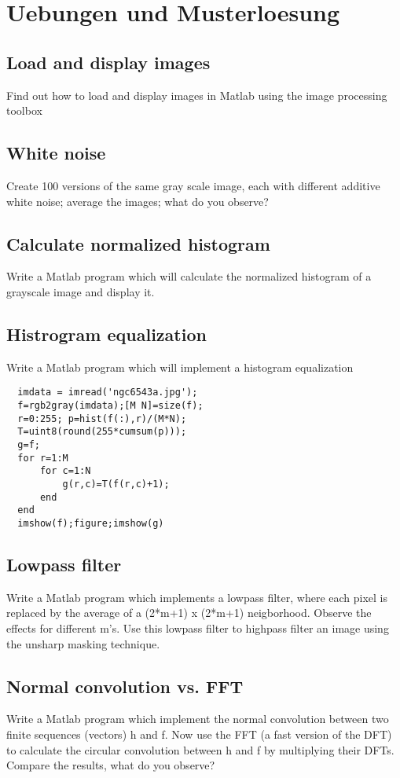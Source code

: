 \section{Uebungen und Musterloesung}
\lstset{language=Matlab}
\subsection{Load and display images}
Find out how to load and display images in Matlab using the image processing
toolbox
\subsection{White noise}
Create 100 versions of the same gray scale image, each with different additive
white noise; average the images; what do you observe?
\subsection{Calculate normalized histogram}
Write a Matlab program which will calculate the normalized histogram of a
grayscale image and display it. 
\subsection{Histrogram equalization}
Write a Matlab program which will implement a histogram equalization
\begin{lstlisting}
  imdata = imread('ngc6543a.jpg');
  f=rgb2gray(imdata);[M N]=size(f);
  r=0:255; p=hist(f(:),r)/(M*N);
  T=uint8(round(255*cumsum(p)));
  g=f;
  for r=1:M
      for c=1:N
          g(r,c)=T(f(r,c)+1);
      end
  end
  imshow(f);figure;imshow(g)
\end{lstlisting}
\subsection{Lowpass filter}
Write a Matlab program which implements a lowpass filter, where each pixel is
replaced by the average of a (2*m+1) x (2*m+1) neigborhood. Observe the effects for different m's. Use this lowpass filter to highpass filter an image using the unsharp masking technique. 
\subsection{Normal convolution vs. FFT}
Write a Matlab program which implement the normal convolution between two finite
sequences (vectors) h and f. Now use the FFT (a fast version of the DFT) to calculate the circular convolution between h and f by multiplying their DFTs. Compare the results, what do you observe?
